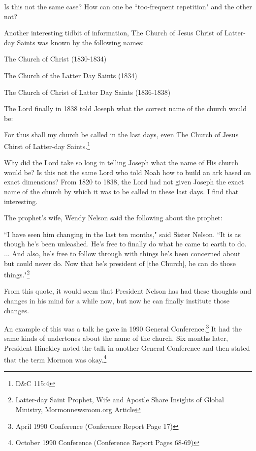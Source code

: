 Is this not the same case? How can one be ``too-frequent repetition" and the other 
not?

Another interesting tidbit of information, The Church of Jesus Christ of Latter-day
Saints was known by the following names:

The Church of Christ (1830-1834)

The Church of the Latter Day Saints (1834)

The Church of Christ of Latter Day Saints (1836-1838)

The Lord finally in 1838 told Joseph what the correct name of the church would be:

\begin{displayquote}
For thus shall my church be called in the last days, even The Church of Jesus Chirst
of Latter-day Saints.\footnote{D\&C 115:4}
\end{displayquote}

Why did the Lord take so long in telling Joseph what the name of His church would be?
Is this not the same Lord who told Noah how to build an ark based on exact
dimensions? From 1820 to 1838, the Lord had not given Joseph the exact name of the
church by which it was to be called in these last days. I find that interesting.

The prophet's wife, Wendy Nelson said the following about the prophet:

\begin{displayquote}
``I have seen him changing in the last ten months," said Sister Nelson. ``It is as 
though he's been unleashed. He's free to finally do what he came to earth to do. ... 
And also, he's free to follow through with things he's been concerned about but 
could never do. Now that he's president of [the Church], he can do those
things."\footnote{Latter-day Saint Prophet, Wife and Apostle Share Insights 
of Global Ministry, Mormonnewsroom.org Article}
\end{displayquote}

From this quote, it would seem that President Nelson has had these thoughts and
changes in his mind for a while now, but now he can finally institute those changes.

An example of this was a talk he gave in 1990 General Conference.\footnote{April 1990 
Conference (Conference Report Page 17)} It had the same kinds of undertones about the 
name of the church. Six months later, President Hinckley noted the talk in another 
General Conference and then stated that the term Mormon was okay.\footnote{October 
1990 Conference (Conference Report Pages 68-69)}